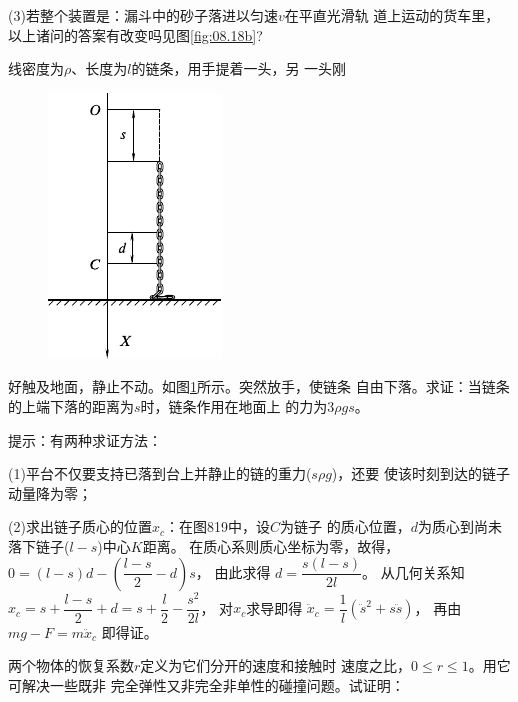\begin{exercises}
\clearpage
(3)若整个装置是：漏斗中的砂子落进以匀速$ v $在平直光滑轨
道上运动的货车里，\hspace{-0.2em}以上诸问的答案有改变吗\lhbrak \hspace{-0.2em}见图\ref{fig:08.18b}\hspace{-0.2em}\rhbrak ?

\exercise 线密度为$ \rho $、长度为$ l $的链条，用手提着一头，另
一头刚
\begin{figure}
  \centering
  \includegraphics{figure/fig08.19}
  \caption{}
  \label{fig:08.19}
\end{figure}
好触及地面，静止不动。如图\ref{fig:08.19}所示。突然放手，使链条
自由下落。求证：当链条的上端下落的距离为$ s $时，链条作用在地面上
的力为$ 3 \rho g s $。

\lhbrak 提示：有两种求证方法：

(1)平台不仅要支持已落到台上并静止的链的重力($ s \rho g $)，还要
使该时刻到达的链子动量降为零；

(2)求出链子质心的位置$ x _ { c } $：在图819中，设$ C $为链子
的质心位置，$ d $为质心到尚未落下链子($ l - s $)中心$ K $距离。
在质心系则质心坐标为零，故得，
$ 0 = \left( l - s \right) d - \left( \dfrac { l - s } { 2 } -d \right) s $，
由此求得
$ d = \dfrac { s \left( l - s \right) } { 2 l } $。
从几何关系知
$ x _ { c } = s + \dfrac { l - s } { 2 } + d = s + \dfrac { l } { 2 } - \dfrac { s ^ { 2 } } { 2 l } $，
对$ x _ { c } $求导即得
$ \ddot { x } _ { c } = \dfrac { 1 } { l }\left( \ddot { s } ^ 2 + s \ddot { s } \right)$，
再由$ m g - F = m \ddot { x } _ { c }$ 即得证\rhbrak 。

\exercise 两个物体的恢复系数$ r $定义为它们分开的速度和接触时
速度之比，$ 0 \leqslant r \leqslant 1 $。用它可解决一些既非
完全弹性又非完全非单性的碰撞问题。试证明：


\end{exercises}
